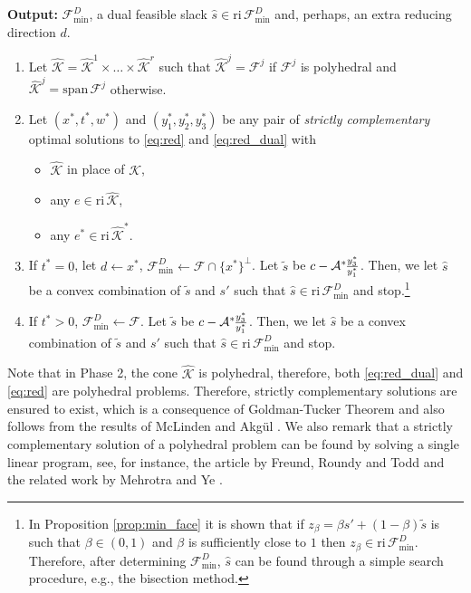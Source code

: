 \documentclass{article}
\newcommand{\reInt}{\mathrm{ri}\,}
\newcommand{\spanVec}{\mathrm{span}\,}
\newcommand{\minFaceD}{ {\mathcal{F}_{\min}^D}}
\newcommand{\stdMap}{ {\mathcal{A}}}
\newcommand{\stdCone}{ {\mathcal{K}}}
\newcommand{\stdFace}{ \mathcal{F}}
\newcommand{\stdInt}{ {e}}
\newcommand{\T}{\ast\hspace{-1pt}}
\begin{document}
{\bf Output:} $\minFaceD$, a dual feasible slack $\hat s \in \reInt \minFaceD$ and, perhaps, 
an extra reducing direction $d$.
\begin{enumerate}
\item Let $\hat \stdCone = {\hat \stdCone} ^1\times \ldots \times {\hat \stdCone} ^r$ such that ${\hat \stdCone} ^j = \stdFace ^j$ if 
$\stdFace ^j$ is polyhedral and $\hat \stdCone ^j = \spanVec \stdFace^j$ otherwise. 
\item Let $(x^*,t^*,w^*)$ and $(y_1^*,y_2^*,y_3^*)$ be
any pair of \emph{strictly complementary} optimal solutions to \eqref{eq:red} and \eqref{eq:red_dual} with
\begin{itemize}
	\item $\hat \stdCone$ in place of $\stdCone$,
	\item any $\stdInt \in \reInt \hat \stdCone$,
	\item any $\stdInt^* \in \reInt {\hat \stdCone}^* $.
\end{itemize}
\item If $t^* = 0$, let $d \leftarrow x^*$, $\minFaceD \leftarrow \stdFace \cap \{x^*\}^\perp$.
Let $\tilde s$ be $c  -\stdMap^\T  \frac{y_3^*}{y_1^*} $. Then, we let 
$\hat s$ be a convex combination of $\tilde s$ and $s'$ such that $\hat s \in \reInt \minFaceD$ and stop.\footnote{\label{foot}In Proposition \ref{prop:min_face} it is shown that if $z_\beta = \beta s' + (1-\beta)\tilde s $ is such that $\beta \in (0,1)$ and $\beta$ is sufficiently close to $1$ then $z_\beta \in  \reInt \minFaceD$. Therefore, after determining $\minFaceD$, $\hat s$ can be found through a simple search procedure, e.g., the bisection method.} %
\item If $t^* > 0$,  $\minFaceD \leftarrow \stdFace$.
Let $\tilde s$ be $c  -\stdMap^\T  \frac{y_3^*}{y_1^*} $. Then, we let 
$\hat s$ be a convex combination of $\tilde s$ and $s'$ such that $\hat s \in \reInt \minFaceD$ and stop.%

\end{enumerate}


Note that in Phase 2, the cone $\hat{\stdCone}$ is polyhedral, therefore, 
both \eqref{eq:red_dual} and \eqref{eq:red} are 
polyhedral problems. Therefore,  strictly complementary solutions are ensured to exist, which is a 
consequence of Goldman-Tucker Theorem and also follows from the results of 
McLinden \cite{McLinden82} and Akg\"ul \cite{Akgul84}. 
We also remark that a strictly complementary solution of a polyhedral problem can be found by solving 
a single linear program, see, for instance, the article by Freund, Roundy and Todd \cite{FRT85} and the related 
work by Mehrotra and Ye \cite{MY93}. 
\end{document}
